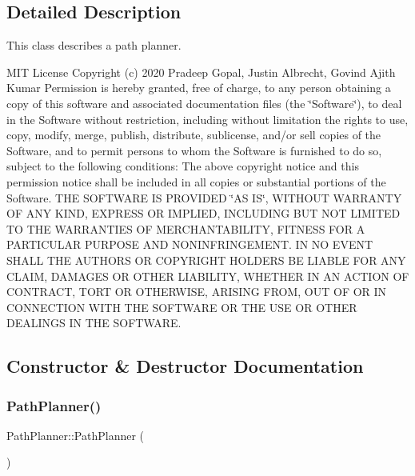 \subsection{Detailed Description}
This class describes a path planner. 

M\+IT License Copyright (c) 2020 Pradeep Gopal, Justin Albrecht, Govind Ajith Kumar Permission is hereby granted, free of charge, to any person obtaining a copy of this software and associated documentation files (the \char`\"{}\+Software\char`\"{}), to deal in the Software without restriction, including without limitation the rights to use, copy, modify, merge, publish, distribute, sublicense, and/or sell copies of the Software, and to permit persons to whom the Software is furnished to do so, subject to the following conditions\+: The above copyright notice and this permission notice shall be included in all copies or substantial portions of the Software. T\+HE S\+O\+F\+T\+W\+A\+RE IS P\+R\+O\+V\+I\+D\+ED \char`\"{}\+A\+S I\+S\char`\"{}, W\+I\+T\+H\+O\+UT W\+A\+R\+R\+A\+N\+TY OF A\+NY K\+I\+ND, E\+X\+P\+R\+E\+SS OR I\+M\+P\+L\+I\+ED, I\+N\+C\+L\+U\+D\+I\+NG B\+UT N\+OT L\+I\+M\+I\+T\+ED TO T\+HE W\+A\+R\+R\+A\+N\+T\+I\+ES OF M\+E\+R\+C\+H\+A\+N\+T\+A\+B\+I\+L\+I\+TY, F\+I\+T\+N\+E\+SS F\+OR A P\+A\+R\+T\+I\+C\+U\+L\+AR P\+U\+R\+P\+O\+SE A\+ND N\+O\+N\+I\+N\+F\+R\+I\+N\+G\+E\+M\+E\+NT. IN NO E\+V\+E\+NT S\+H\+A\+LL T\+HE A\+U\+T\+H\+O\+RS OR C\+O\+P\+Y\+R\+I\+G\+HT H\+O\+L\+D\+E\+RS BE L\+I\+A\+B\+LE F\+OR A\+NY C\+L\+A\+IM, D\+A\+M\+A\+G\+ES OR O\+T\+H\+ER L\+I\+A\+B\+I\+L\+I\+TY, W\+H\+E\+T\+H\+ER IN AN A\+C\+T\+I\+ON OF C\+O\+N\+T\+R\+A\+CT, T\+O\+RT OR O\+T\+H\+E\+R\+W\+I\+SE, A\+R\+I\+S\+I\+NG F\+R\+OM, O\+UT OF OR IN C\+O\+N\+N\+E\+C\+T\+I\+ON W\+I\+TH T\+HE S\+O\+F\+T\+W\+A\+RE OR T\+HE U\+SE OR O\+T\+H\+ER D\+E\+A\+L\+I\+N\+GS IN T\+HE S\+O\+F\+T\+W\+A\+RE. 

\subsection{Constructor \& Destructor Documentation}
\mbox{\label{class_path_planner_a376f30d795cfe0a40f8923f49336f7da}} 
\subsubsection{\texorpdfstring{Path\+Planner()}{PathPlanner()}}
{\footnotesize\ttfamily Path\+Planner\+::\+Path\+Planner (\begin{DoxyParamCaption}{ }\end{DoxyParamCaption})}



